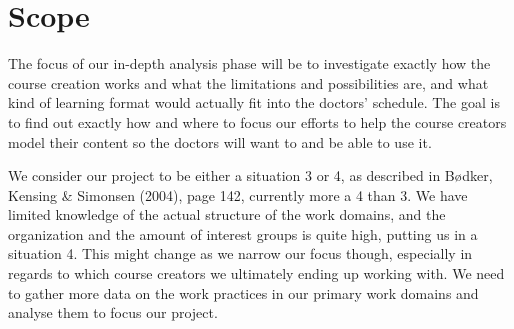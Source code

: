 \section{Scope}
The focus of our in-depth analysis phase will be to investigate exactly how the course creation works and what the limitations and possibilities are, and what kind of learning format would actually fit into the doctors’ schedule. The goal is to find out exactly how and where to focus our efforts to help the course creators model their content so the doctors will want to and be able to use it.

We consider our project to be either a situation 3 or 4, as described in Bødker, Kensing & Simonsen (2004), page 142, currently more a 4 than 3. We have limited knowledge of the actual structure of the work domains, and the organization and the amount of interest groups is quite high, putting us in a situation 4. This might change as we narrow our focus though, especially in regards to which course creators we ultimately ending up working with.
We need to gather more data on the work practices in our primary work domains and analyse them to focus our project.
